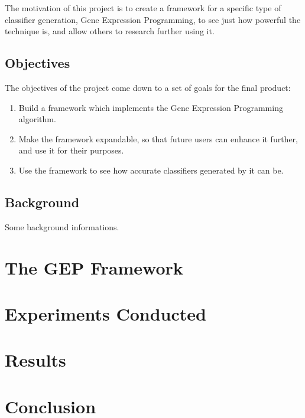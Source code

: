 \documentclass[a4paper,11pt]{report}
\begin{document}
The motivation of this project is to create a framework for a specific type of classifier
generation, Gene Expression Programming, to see just how powerful the technique is, and 
allow others to research further using it.

\section{Objectives}

The objectives of the project come down to a set of goals for the final product:

\begin{enumerate}

 \item Build a framework which implements the Gene Expression Programming algorithm.

 \item Make the framework expandable, so that future users can enhance it further, and use it for their purposes. 

 \item Use the framework to see how accurate classifiers generated by it can be. 

\end{enumerate}






\section{Background}
Some background informations.




\chapter{The GEP Framework}


\chapter{Experiments Conducted}



\chapter{Results}


\chapter{Conclusion}
\end{document}
